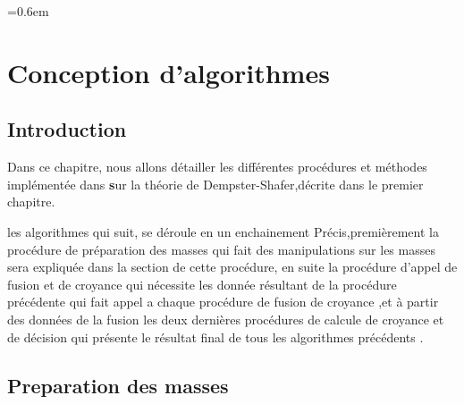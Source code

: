 \parskip=0.6em
\chapter{Conception d'algorithmes}


\section*{Introduction}

Dans ce chapitre, nous allons détailler les différentes procédures et méthodes implémentée dans \textbf sur la théorie de Dempster-Shafer,décrite dans le premier chapitre.

les algorithmes qui suit, se déroule en un enchainement Précis,premièrement la procédure de préparation des masses qui fait des manipulations sur les masses sera expliquée dans la section de cette procédure, en suite la procédure d'appel de fusion et de croyance qui nécessite les donnée résultant de la procédure précédente qui fait appel a chaque procédure de fusion de croyance ,et à partir des données de la fusion les deux dernières procédures de calcule de croyance et de décision qui présente le résultat final de tous les algorithmes précédents .
{}
\DontPrintSemicolon
\section{Preparation des masses}

